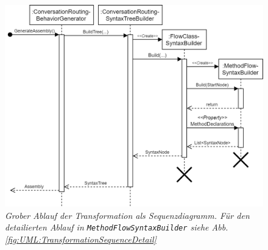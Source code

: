 \begin{figure} %
	\centering
		\includegraphics[width=\textwidth]{img/TransformationSequence.png}
	\caption[Transformationsablauf]{\textit{Grober Ablauf der Transformation als Sequenzdiagramm. Für den detailierten Ablauf in \texttt{MethodFlowSyntaxBuilder} siehe Abb. \ref{fig:UML:TransformationSequenceDetail} }}
	\label{fig:UML:TransformationSequence}
\end{figure}

